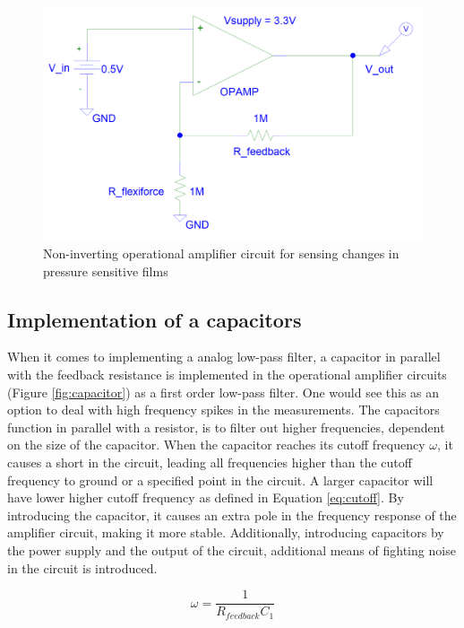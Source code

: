 \begin{figure}
    \centering
    \includegraphics[scale=0.3]{figures/noninverting_opamp.png}
    \caption{Non-inverting operational amplifier circuit for sensing changes in pressure sensitive films}
    \label{fig:noninvertingopamp}
\end{figure}

\subsection{Implementation of a capacitors}
\label{subsec:capacitor}
When it comes to implementing a analog low-pass filter, a capacitor in parallel with the feedback resistance is implemented in the operational amplifier circuits (Figure \ref{fig:capacitor}) as a first order low-pass filter. One would see this as an option to deal with high frequency spikes in the measurements. The capacitors function in parallel with a resistor, is to filter out higher frequencies, dependent on the size of the capacitor. When the capacitor reaches its cutoff frequency $\omega$, it causes a short in the circuit, leading all frequencies higher than the cutoff frequency to ground or a specified point in the circuit. A larger capacitor will have lower higher cutoff frequency as defined in Equation \ref{eq:cutoff}. By introducing the capacitor, it causes an extra pole in the frequency response of the amplifier circuit, making it more stable. Additionally, introducing capacitors by the power supply and the output of the circuit, additional means of fighting noise in the circuit is introduced.

\begin{equation}
\label{eq:cutoff}
    \omega = \frac{1}{R_{feedback}C_1}
\end{equation}


